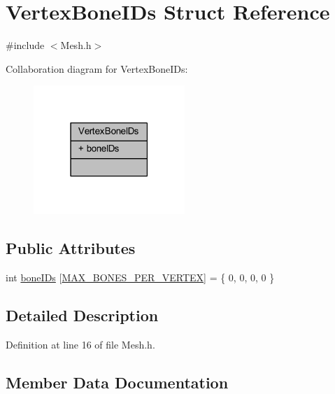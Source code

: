 \hypertarget{struct_vertex_bone_i_ds}{}\section{Vertex\+Bone\+I\+Ds Struct Reference}
\label{struct_vertex_bone_i_ds}


{\ttfamily \#include $<$Mesh.\+h$>$}



Collaboration diagram for Vertex\+Bone\+I\+Ds\+:\nopagebreak
\begin{figure}[H]
\begin{center}
\leavevmode
\includegraphics[width=162pt]{struct_vertex_bone_i_ds__coll__graph}
\end{center}
\end{figure}
\subsection*{Public Attributes}
\begin{DoxyCompactItemize}
\item 
int \hyperlink{struct_vertex_bone_i_ds_a61ea9b129c56814ce6b18aefac6ba93a}{bone\+I\+Ds} \mbox{[}\hyperlink{_mesh_8h_a590674a40eadbbd60bd8a3aefe485631}{M\+A\+X\+\_\+\+B\+O\+N\+E\+S\+\_\+\+P\+E\+R\+\_\+\+V\+E\+R\+T\+EX}\mbox{]} = \{ 0, 0, 0, 0 \}
\end{DoxyCompactItemize}


\subsection{Detailed Description}


Definition at line 16 of file Mesh.\+h.



\subsection{Member Data Documentation}

